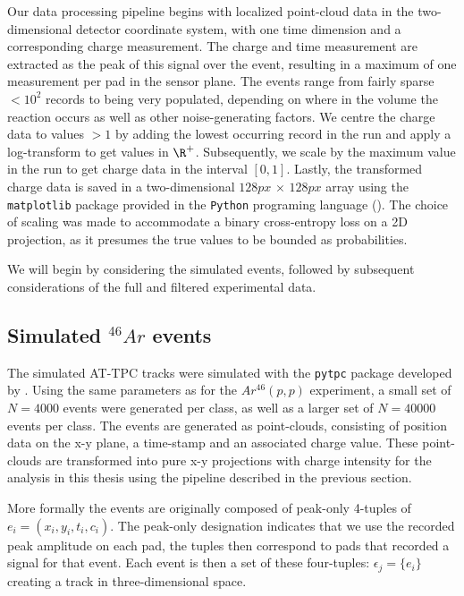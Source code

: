 Our data processing pipeline begins with localized point-cloud data in the two-dimensional detector coordinate system, with one time dimension and a corresponding charge measurement. The charge and time measurement are extracted as the peak of this signal over the event, resulting in a maximum of one measurement per pad in the sensor plane. The events range from fairly sparse $< 10^2$ records to being very populated, depending on where in the volume the reaction occurs as well as other noise-generating factors. We centre the charge data to values $>1$ by adding the lowest occurring record in the run and apply a log-transform to get values in $\R^+$. Subsequently, we scale by the maximum value in the run to get charge data in the interval $[0, 1]$. Lastly, the transformed charge data is saved in a two-dimensional $128px\, \times \,128px$ array using the \lstinline{matplotlib} package provided in the \lstinline{Python} programing language (\cite{matplotlib}). The choice of scaling was made to accommodate a binary cross-entropy loss on a 2D projection, as it presumes the true values to be bounded as probabilities.

We will begin by considering the simulated events, followed by subsequent considerations of the full and filtered experimental data.

\subsection{Simulated \texorpdfstring{${}^{46}Ar$}{46Ar}  events}\label{sec:data_sim}

The simulated AT-TPC tracks were simulated with the \lstinline{pytpc} package developed by \citet{Bradt2017a}. Using the same parameters as for the $Ar^{46}(p, p)$ experiment, a small set of $N=4000$ events were generated per class, as well as a larger set of $N=40000$ events per class. The events are generated as point-clouds, consisting of position data on the x-y plane, a time-stamp and an associated charge value. These point-clouds are transformed into pure x-y projections with charge intensity for the analysis in this thesis using the pipeline described in the previous section. 

More formally the events are originally composed of peak-only 4-tuples of $e_i = (x_i, y_i, t_i, c_i)$. The peak-only designation indicates that we use the recorded peak amplitude on each pad, the tuples then correspond to pads that recorded a signal for that event. Each event is then a set of these four-tuples: $\epsilon_j = \{e_i\}$ creating a track in three-dimensional space. 

